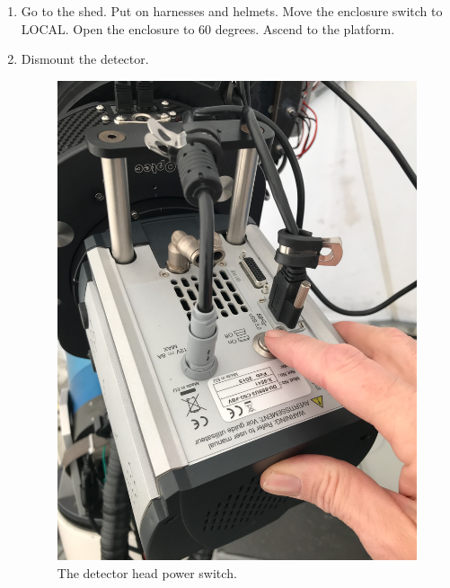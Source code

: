 \begin{enumerate}

\item Go to the shed. Put on harnesses and helmets. Move the enclosure switch to LOCAL. Open the enclosure to 60 degrees. Ascend to the platform.
    
\item Dismount the detector.

\begin{figure}
\begin{center}
\includegraphics[angle=0,width=0.8\linewidth]{figures/huitzi-f20-detector-power-switch.jpg}
\end{center}
\caption{The detector head power switch.}
\label{figure:huitzi-f20-detector-power-switch}
\end{figure}


\end{enumerate}
